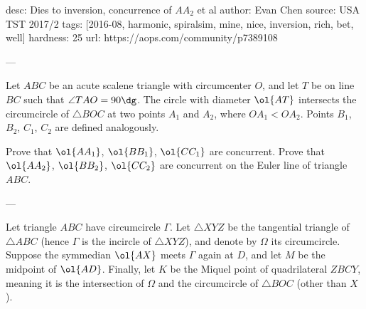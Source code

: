 desc: Dies to inversion, concurrence of $AA_2$ et al
author: Evan Chen
source: USA TST 2017/2
tags: [2016-08, harmonic, spiralsim, mine, nice, inversion, rich, bet, well]
hardness: 25
url: https://aops.com/community/p7389108

---

Let $ABC$ be an acute scalene triangle with circumcenter $O$,
and let $T$ be on line $BC$ such that $\angle TAO = 90\dg$.
The circle with diameter $\ol{AT}$
intersects the circumcircle of $\triangle BOC$ at two points
$A_1$ and $A_2$, where $OA_1 < OA_2$.
Points $B_1$, $B_2$, $C_1$, $C_2$ are defined analogously.
\begin{enumerate}
  \ii[(a)]
  Prove that $\ol{AA_1}$, $\ol{BB_1}$, $\ol{CC_1}$ are concurrent.
  \ii[(b)]
  Prove that $\ol{AA_2}$, $\ol{BB_2}$, $\ol{CC_2}$ are concurrent
  on the Euler line of triangle $ABC$.
\end{enumerate}

---

Let triangle $ABC$ have circumcircle $\Gamma$.
Let $\triangle XYZ$ be the tangential triangle of $\triangle ABC$
(hence $\Gamma$ is the incircle of $\triangle XYZ$),
and denote by $\Omega$ its circumcircle.
Suppose the symmedian $\ol{AX}$ meets $\Gamma$ again at $D$,
and let $M$ be the midpoint of $\ol{AD}$.
Finally, let $K$ be the Miquel point of quadrilateral $ZBCY$,
meaning it is the intersection of $\Omega$
and the circumcircle of $\triangle BOC$ (other than $X$).

